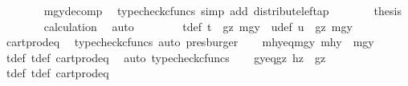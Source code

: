 \begin{isabellebody}
\ \ \ \ \ \ \isamarkupfalse%
\ mgy{\isacharunderscore}{\kern0pt}decomp\ \isamarkupfalse%
\ {\isacharparenleft}{\kern0pt}typecheck{\isacharunderscore}{\kern0pt}cfuncs{\isacharcomma}{\kern0pt}\ simp\ add{\isacharcolon}{\kern0pt}\ distribute{\isacharunderscore}{\kern0pt}left{\isacharunderscore}{\kern0pt}ap{\isacharparenright}{\kern0pt}\isanewline
\ \ \ \ \isamarkupfalse%
\ \isamarkupfalse%
\ {\isacharquery}{\kern0pt}thesis\isanewline
\ \ \ \ \ \ \isamarkupfalse%
\ calculation\ \isamarkupfalse%
\ auto\isanewline
\ \ \isamarkupfalse%
\isanewline
\ \ \isamarkupfalse%
\ \isamarkupfalse%
\ t{\isacharunderscore}{\kern0pt}def{}{\isacharcolon}{\kern0pt}\ {\isachardoublequoteopen}t\ {\isacharequal}{\kern0pt}\ {\isasymlangle}gz{\isacharcomma}{\kern0pt}\ mgy{}{\isasymrangle}{\isachardoublequoteclose}\ \ u{\isacharunderscore}{\kern0pt}def{\isacharcolon}{\kern0pt}\ {\isachardoublequoteopen}u\ {\isacharequal}{\kern0pt}\ {\isasymlangle}gz{\isacharcomma}{\kern0pt}\ mgy{}{\isasymrangle}{\isachardoublequoteclose}\isanewline
\ \ \ \ \isamarkupfalse%
\ cart{\isacharunderscore}{\kern0pt}prod{\isacharunderscore}{\kern0pt}eq{}\ \isamarkupfalse%
\ {\isacharparenleft}{\kern0pt}typecheck{\isacharunderscore}{\kern0pt}cfuncs{\isacharcomma}{\kern0pt}\ auto{\isacharcomma}{\kern0pt}\ presburger{\isacharparenright}{\kern0pt}\isanewline
\ \ \isamarkupfalse%
\ mhy{}{\isacharunderscore}{\kern0pt}eq{\isacharunderscore}{\kern0pt}mgy{}{\isacharcolon}{\kern0pt}\ {\isachardoublequoteopen}mhy{}\ {\isacharequal}{\kern0pt}\ mgy{}{\isachardoublequoteclose}\isanewline
\ \ \ \ \isamarkupfalse%
\ t{\isacharunderscore}{\kern0pt}def{}\ t{\isacharunderscore}{\kern0pt}def\ cart{\isacharunderscore}{\kern0pt}prod{\isacharunderscore}{\kern0pt}eq{}\ \isamarkupfalse%
\ {\isacharparenleft}{\kern0pt}auto{\isacharcomma}{\kern0pt}\ typecheck{\isacharunderscore}{\kern0pt}cfuncs{\isacharparenright}{\kern0pt}\isanewline
\ \ \isamarkupfalse%
\ gy{\isacharunderscore}{\kern0pt}eq{\isacharunderscore}{\kern0pt}gz{\isacharcolon}{\kern0pt}\ {\isachardoublequoteopen}hz\ {\isacharequal}{\kern0pt}\ gz{\isachardoublequoteclose}\isanewline
\ \ \ \ \isamarkupfalse%
\ t{\isacharunderscore}{\kern0pt}def{}\ t{\isacharunderscore}{\kern0pt}def\ cart{\isacharunderscore}{\kern0pt}prod{\isacharunderscore}{\kern0pt}eq{}\ \isamarkupfalse%

\end{isabellebody}
